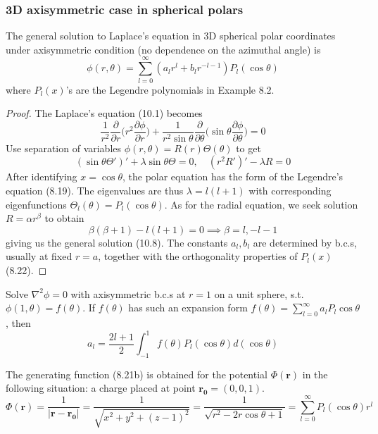 \documentclass[a4paper]{article}
\begin{document}
\subsubsection{3D axisymmetric case in spherical polars}
\begin{prop}
The general solution to Laplace's equation in 3D spherical polar coordinates under axisymmetric condition (no dependence on the azimuthal angle) is
\begin{equation}
\phi(r,\theta)=\sum_{l=0}^\infty(a_lr^l+b_lr^{-l-1})P_l(\cos\theta)\tag{10.7}
\end{equation}
where $P_l(x)$'s are the Legendre polynomials in Example 8.2.
\end{prop}
\begin{proof}
The Laplace's equation (10.1) becomes
\begin{equation}
    \frac{1}{r^2}\frac{\partial}{\partial r}\bigg(r^2\frac{\partial\phi}{\partial r}\bigg)+\frac{1}{r^2\sin\theta}\frac{\partial}{\partial\theta}\bigg(\sin\theta\frac{\partial\phi}{\partial\theta}\bigg)=0\tag{10.8}
\end{equation}
Use separation of variables $\phi(r,\theta)=R(r)\Theta(\theta)$ to get
\begin{equation}
(\sin\theta\Theta')'+\lambda\sin\theta\Theta=0,\quad (r^2R')'-\lambda R=0\tag{10.9}
\end{equation}
After identifying $x=\cos\theta$, the polar equation has the form of the Legendre's equation (8.19). The eigenvalues are thus $\lambda=l(l+1)$ with corresponding eigenfunctions $\Theta_l(\theta)=P_l(\cos\theta)$. As for the radial equation, we seek solution $R=\alpha r^\beta$ to obtain
$$\beta(\beta+1)-l(l+1)=0\implies\beta=l,-l-1$$
giving us the general solution (10.8). The constants $a_l,b_l$ are determined by b.c.s, usually at fixed $r=a$, together with the orthogonality properties of $P_l(x)$ (8.22).
\end{proof}
\begin{eg}
Solve $\nabla^2\phi=0$ with axisymmetric b.c.s at $r=1$ on a unit sphere, s.t. $\phi(1,\theta)=f(\theta)$. If $f(\theta)$ has such an expansion form $f(\theta)=\sum_{l=0}^\infty a_lP_l\cos\theta$, then
$$a_l=\frac{2l+1}{2}\int_{-1}^1f(\theta)P_l(\cos\theta)d(\cos\theta)$$
\end{eg}
\begin{remarks}
The generating function (8.21b) is obtained for the potential $\Phi(\mathbf{r})$ in the following situation: a charge placed at point $\mathbf{r_0}=(0,0,1)$.
$$\Phi(\mathbf{r})=\frac{1}{|\mathbf{r}-\mathbf{r_0}|}=\frac{1}{\sqrt{x^2+y^2+(z-1)^2}}=\frac{1}{\sqrt{r^2-2r\cos\theta+1}}=\sum_{l=0}^\infty P_l(\cos\theta)r^l$$
\end{remarks}
\end{document}
